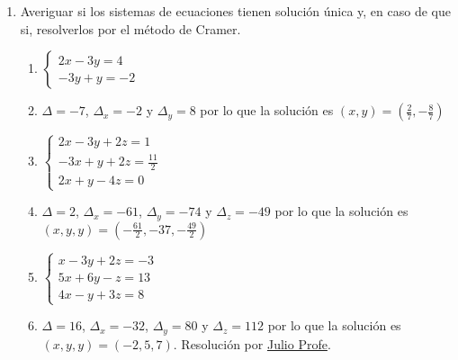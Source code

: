 \documentclass[a4paper]{article}
\newcommand{\answer}{\item[**]}
\newcommand{\exercise}{\item}
\begin{document}
\begin{enumerate}
\begin{multicols}{2}
\begin{enumerate} [label=(\alph*)]
		\item $\begin{pmatrix} 1 & 1-x & -1 \\ x+1 & 1 & -1 \\ 1 & 1 & x+2\end{pmatrix}$
		\answer $M$ es invertible cuando $\det(M)\neq0$, es decir, para $x\neq0$ y $x\neq-2$, o bien $x\in\mathbb{C}-\{0,-2\}$. Resolución por \href{https://youtu.be/KAt_M122xGw}{Profe Córdoba}.

		\item $\begin{pmatrix} 1 & 1 & \lambda \\ \lambda & 2 & -1 \\ 3 & 1 & 1\end{pmatrix}$
		\answer $M$ es invertible cuando $\det(M)\neq0$, es decir, para $\lambda\in\mathbb{C}-\{0,7\}$. Resolución por \href{https://youtu.be/Q1HjTmvsAGc}{Yo Soy Tu Profe}.

	\end{enumerate}
	\end{multicols}

	\exercise Averiguar si los sistemas de ecuaciones tienen solución única y, en caso de que si, resolverlos por el método de Cramer.
	\begin{multicols}{3}
	\begin{enumerate} [label=(\alph*)]

		\item $\left\{\begin{matrix} 2x-3y=4 \\ -3y+y=-2 \end{matrix}\right.$
		\answer $\Delta=-7$, $\Delta_x=-2$ y $\Delta_y=8$ por lo que la solución es $(x,y)=\left(\frac{2}{7},-\frac{8}{7}\right)$

		\item $\left\{\begin{matrix} 2x-3y+2z=1 \\ -3x+y+2z=\frac{11}{2} \\ 2x+y-4z=0 \end{matrix}\right.$
		\answer $\Delta=2$, $\Delta_x=-61$, $\Delta_y=-74$ y $\Delta_z=-49$ por lo que la solución es $(x,y,y)=\left(-\frac{61}{2},-37,-\frac{49}{2}\right)$

		\item $\left\{\begin{matrix} x-3y+2z=-3 \\ 5x+6y-z=13 \\ 4x-y+3z=8 \end{matrix}\right.$
		\answer $\Delta=16$, $\Delta_x=-32$, $\Delta_y=80$ y $\Delta_z=112$ por lo que la solución es $(x,y,y)=(-2,5,7)$. Resolución por \href{https://youtu.be/lLPcHVAqY80}{Julio Profe}.


\end{enumerate}
\end{multicols}
\end{enumerate}
\end{document}
